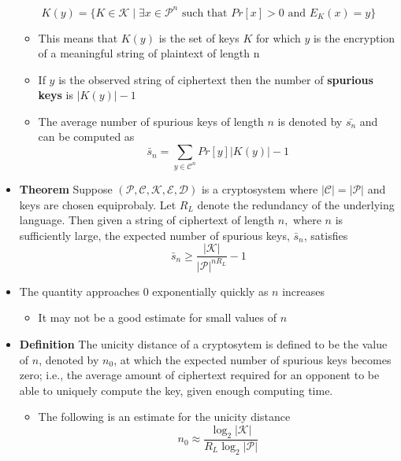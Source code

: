 \begin{itemize}
  \begin{equation*}
    K(y) = \{K \in \mathcal K \mid \exists x \in \mathcal P^n \text{ such that } Pr[x] > 0 \text{ and } E_K(x) = y\}
  \end{equation*}
  \begin{itemize}
    \item This means that $K(y)$ is the set of keys $K$ for which $y$ is the encryption of a meaningful string of plaintext of length n
  	\item If $y$ is the observed string of ciphertext then the number of \textbf{spurious keys} is $|K(y)| -1$
    \item The average number of spurious keys of length $n$ is denoted by $\bar {s_n}$ and can be computed as
    \begin{equation*}
      \bar s_n = \sum_{y \in \mathcal C^n} Pr[y]|K(y)| -1
    \end{equation*}
  \end{itemize}
  \item \textbf{Theorem} Suppose $(\mathcal P, \mathcal C, \mathcal K, \mathcal E, \mathcal D)$ is a cryptosystem where $|\mathcal{C}|=|\mathcal{P}|$ and keys are chosen equiprobaly. Let $R_{L}$ denote the redundancy of the underlying language. Then given a string of ciphertext of length $n,$ where $n$ is sufficiently large, the expected number of spurious keys, $\bar{s}_{n}$, satisfies
  $$
    \bar{s}_{n} \geq \frac{|\mathcal K|}{|\mathcal{P}|^{n R_{L}}}-1
  $$
  \item The quantity approaches 0 exponentially quickly as $n$ increases
  \begin{itemize}
  	\item It may not be a good estimate for small values of $n$
  \end{itemize}
  \item \textbf{Definition} The unicity distance of a cryptosytem is defined to be the value of $n$, denoted by $n_{0}$, at which the expected number of spurious keys becomes zero; i.e., the average amount of ciphertext required for an opponent to be able to uniquely compute the key, given enough computing time.
  \begin{itemize}
  \item The following is an estimate for the unicity distance
  \begin{equation*}
    n_0 \approx \frac{\log_2 |\mathcal K|}{R_L \log_2 | \mathcal P|}
  \end{equation*}
  \end{itemize}
\end{itemize}

